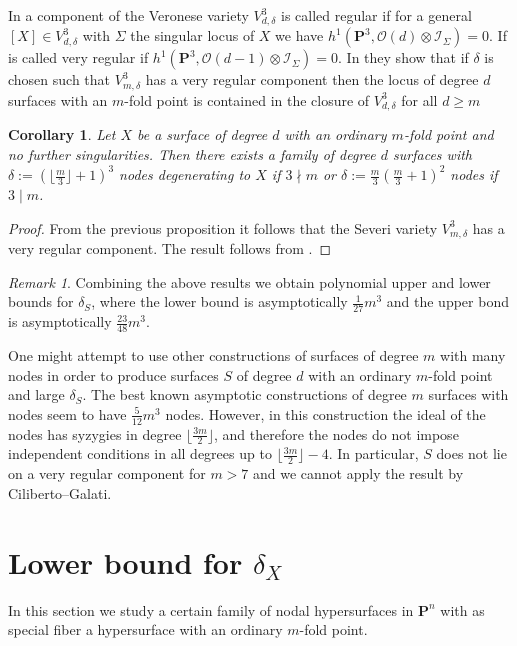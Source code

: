 \documentclass{amsart}
\newcommand{\Ps}{\mathbf{P}}
\newcommand{\cO}{\mathcal{O}}
\newcommand{\cI}{\mathcal{I}}
\newtheorem{corollary}[lemma]{Corollary}
\theoremstyle{definition}
\theoremstyle{remark}
\newtheorem{remark}[lemma]{Remark}
\begin{document}
In \cite{CiGa26} a component of the Veronese variety $V^3_{d,\delta}$ is called regular if for a general $[X]\in V^3_{d,\delta}$ with $\Sigma$ the singular locus of $X$ we have $h^1(\Ps^3,\cO(d)\otimes \cI_{\Sigma})=0$. If is called very regular if $h^1(\Ps^3,\cO(d-1)\otimes \cI_{\Sigma})=0$. In \cite[Theorem 3.3]{CiGa26}
they show that if $\delta$ is chosen such that $V^3_{m,\delta}$ has a very regular component then the locus of degree $d$ surfaces with an $m$-fold point is contained in the closure of $V^3_{d,\delta}$ for all $d\geq m$ 

\begin{corollary} Let $X$ be a surface of degree $d$ with an ordinary $m$-fold point and no further singularities. Then there exists a family of degree $d$ surfaces with $\delta:=(\lfloor \frac{ m}{3}\rfloor+1)^{3}$ nodes degenerating to $X$ if $3\nmid m$ or $\delta:=\frac{m}{3}( \frac{m}{3}+1)^2$ nodes if $3\mid m$. 
\end{corollary}

\begin{proof}
From the previous proposition it follows that the Severi variety $V_{m,\delta}^3$ has a very regular component.  The result follows from \cite[Theorem 3.3]{CiGa26}.
\end{proof}


\begin{remark} Combining the above results we obtain polynomial upper and lower bounds for $\delta_S$, where the lower bound is asymptotically $\frac{1}{27}m^3$ and the upper bond is asymptotically $\frac{23}{48} m^3$.

One might attempt to use other constructions of surfaces of degree $m$ with many nodes in order to produce surfaces $S$ of degree $d$ with an ordinary $m$-fold point and large $\delta_S$.
The best known asymptotic constructions of degree $m$ surfaces with nodes seem to have  $\frac{5}{12} m^3$ nodes.
However, in this construction the ideal of the nodes  has syzygies in degree $\lfloor \frac{3m}{2}\rfloor$, and therefore the nodes do not impose independent conditions in all degrees up to  $\lfloor \frac{3m}{2}\rfloor-4$. In particular, $S$ does not lie on a very regular component for $m>7$ and we cannot apply the result by Ciliberto--Galati.
\end{remark}

\section{Lower bound for $\delta_X$}\label{secLowSec}
In this section we study a certain family  of nodal hypersurfaces in $\Ps^n$  with as special fiber a hypersurface with an ordinary $m$-fold point.
\end{document}
